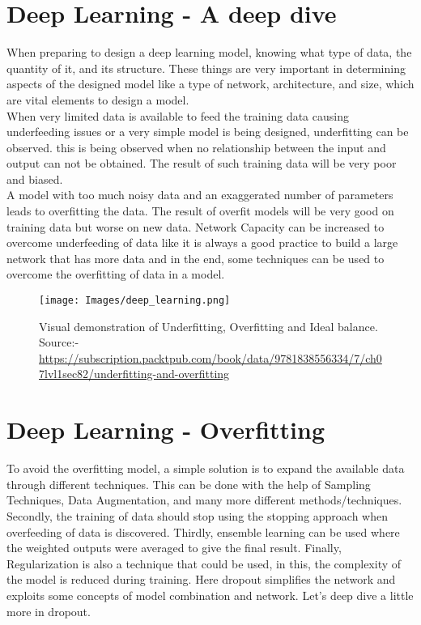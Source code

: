 \documentclass[12pt,letterpaper]{report}
\begin{document}
\section{Deep Learning - A deep dive}
When preparing to design a deep learning model, knowing what type of data, the quantity of it, and its structure. These things are very important in determining aspects of the designed model like a type of network, architecture, and size, which are vital elements to design a model.\\

When very limited data is available to feed the training data causing underfeeding issues or a very simple model is being designed, underfitting can be observed. this is being observed when no relationship between the input and output can not be obtained\cite{9}. The result of such training data will be very poor and biased.   \\

A model with too much noisy data and an exaggerated number of parameters leads to overfitting the data\cite{10}. The result of overfit models will be very good on training data but worse on new data. Network Capacity can be increased to overcome underfeeding of data like it is always a good practice to build a large network that has more data and in the end, some techniques can be used to overcome the overfitting of data in a model.\\

\begin{figure}[h]
    \centering
    \texttt{[image: Images/deep\_learning.png]}
    \caption{Visual demonstration of Underfitting, Overfitting and Ideal balance. \\Source:- \href{https://subscription.packtpub.com/book/data/9781838556334/7/ch07lvl1sec82/underfitting-and-overfitting}{https://subscription.packtpub.com/book/data/9781838556334/7/ch07lvl1sec82/underfitting-and-overfitting}}
    \label{fig:deep_learning_models}
\end{figure}

\section{Deep Learning - Overfitting}
To avoid the overfitting model, a simple solution is to expand the available data through different techniques. This can be done with the help of Sampling Techniques, Data Augmentation, and many more different methods/techniques. Secondly, the training of data should stop using the stopping approach when overfeeding of data is discovered. Thirdly, ensemble learning can be used where the weighted outputs were averaged to give the final result. Finally, Regularization is also a technique that could be used, in this, the complexity of the model is reduced during training. Here dropout simplifies the network and exploits some concepts of model combination and network. Let's deep dive a little more in dropout. 
\end{document}
